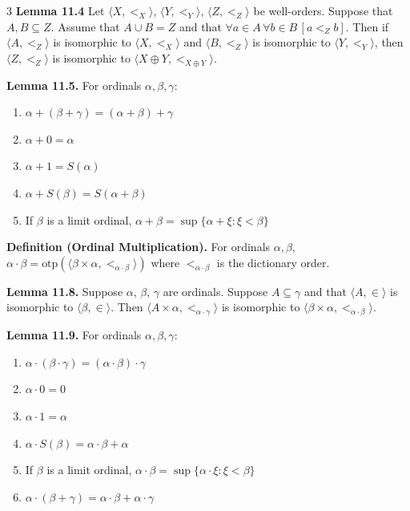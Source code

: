 \documentclass[landscape,8pt]{article}
\newcommand{\ot}{\text{otp}}
\begin{document}
\begin{multicols}{3}
	\noindent\textbf{Lemma 11.4} Let $\langle X, <_X \rangle$, $\langle Y, <_Y \rangle$, $\langle Z, <_Z \rangle$ be well-orders. Suppose that $A, B \subseteq Z$. Assume that $A \cup B = Z$ and that $\forall a \in A \, \forall b \in B \, [a <_Z b]$. Then if $\langle A, <_Z \rangle$ is isomorphic to $\langle X, <_X \rangle$ and $\langle B, <_Z \rangle$ is isomorphic to $\langle Y, <_Y \rangle$, then $\langle Z, <_Z \rangle$ is isomorphic to $\langle X \oplus Y, <_{X \oplus Y} \rangle$.

	\noindent\textbf{Lemma 11.5.} For ordinals $\alpha, \beta, \gamma$:
	\begin{enumerate}[noitemsep,topsep=0pt]
		\item $\alpha + (\beta + \gamma) = (\alpha + \beta) + \gamma$
		\item $\alpha + 0 = \alpha$
		\item $\alpha + 1 = S(\alpha)$
		\item $\alpha + S(\beta) = S(\alpha + \beta)$
		\item If $\beta$ is a limit ordinal, $\alpha + \beta = \sup\{\alpha + \xi : \xi < \beta\}$
	\end{enumerate}

	\noindent\textbf{Definition (Ordinal Multiplication).} For ordinals $\alpha, \beta$, $\alpha \cdot \beta = \ot(\langle \beta \times \alpha, <_{\alpha \cdot \beta} \rangle)$ where $<_{\alpha \cdot \beta}$ is the dictionary order.

	\noindent\textbf{Lemma 11.8.} Suppose $\alpha$, $\beta$, $\gamma$ are ordinals. Suppose $A \subseteq \gamma$ and that $\langle A, \in \rangle$ is isomorphic to $\langle \beta, \in \rangle$. Then $\langle A \times \alpha, <_{\alpha \cdot \gamma} \rangle$ is isomorphic to $\langle \beta \times \alpha, <_{\alpha \cdot \beta} \rangle$.

	\noindent\textbf{Lemma 11.9.} For ordinals $\alpha, \beta, \gamma$:
	\begin{enumerate}[noitemsep,topsep=0pt]
		\item $\alpha \cdot (\beta \cdot \gamma) = (\alpha \cdot \beta) \cdot \gamma$
		\item $\alpha \cdot 0 = 0$
		\item $\alpha \cdot 1 = \alpha$
		\item $\alpha \cdot S(\beta) = \alpha \cdot \beta + \alpha$
		\item If $\beta$ is a limit ordinal, $\alpha \cdot \beta = \sup\{\alpha \cdot \xi : \xi < \beta\}$
		\item $\alpha \cdot (\beta + \gamma) = \alpha \cdot \beta + \alpha \cdot \gamma$
	\end{enumerate}


\end{multicols}
\end{document}
